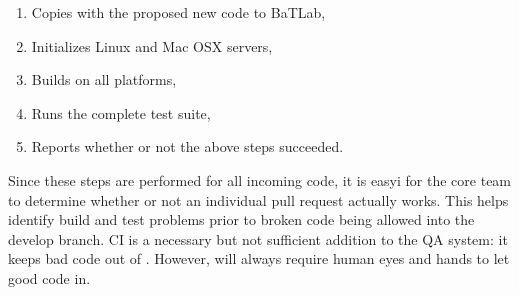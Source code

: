 \begin{enumerate}
    \item Copies \Cyclus with the proposed new code to BaTLab,
    \item Initializes Linux and Mac OSX servers,
    \item Builds \Cyclus on all platforms,
    \item Runs the complete \Cyclus test suite,
    \item Reports whether or not the above steps succeeded.
\end{enumerate}

Since these steps are performed for all incoming code, it is easyi for the
\Cyclus core team to determine whether or not an individual pull request
actually works. This helps identify build and test problems prior to
broken code being allowed into the develop branch. \gls{CI} is a necessary
but not sufficient addition to the \Cyclus \gls{QA}
system: it keeps bad code out of \Cyclus. However, \Cyclus will always
require human eyes and hands to let good code in.
